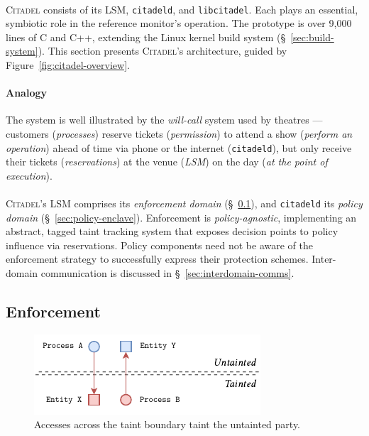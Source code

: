 \paragraph{} \textsc{Citadel} consists of its LSM, \texttt{citadeld}, and \texttt{libcitadel}. Each plays an essential, symbiotic role in the reference monitor's operation. The prototype is over 9,000 lines of C and C++, extending the Linux kernel build system (§~\ref{sec:build-system}). This section presents \textsc{Citadel}'s architecture, guided by Figure~\ref{fig:citadel-overview}.

\paragraph{Analogy} The system is well illustrated by the \textit{will-call} system used by theatres --- customers (\textit{processes}) reserve tickets (\textit{permission}) to attend a show (\textit{perform an operation}) ahead of time via phone or the internet (\texttt{citadeld}), but only receive their tickets (\textit{reservations}) at the venue (\textit{LSM}) on the day (\textit{at the point of execution}).

\paragraph{} \textsc{Citadel}'s LSM comprises its \textit{enforcement domain} (§~\ref{sec:enforcement-domain}), and \texttt{citadeld} its \textit{policy domain} (§~\ref{sec:policy-enclave}). Enforcement is \textit{policy-agnostic}, implementing an abstract, tagged taint tracking system that exposes decision points to policy influence via reservations. Policy components need not be aware of the enforcement strategy to successfully express their protection schemes. Inter-domain communication is discussed in §~\ref{sec:interdomain-comms}.



\subsection{Enforcement}
\label{sec:enforcement-domain}

\begin{figure}[]
    \centering
    \includegraphics[width=0.55\linewidth]{figures/CitadelTaint.pdf}
    \caption[Accesses across the taint boundary]{Accesses across the taint boundary taint the untainted party.}
    \label{fig:taint-boundary}
\end{figure}

